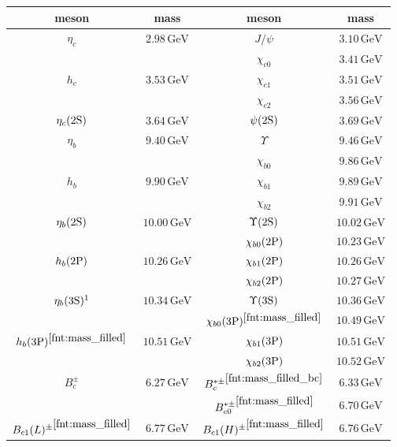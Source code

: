 \begin{table}[H]
\centering
\renewcommand*{\arraystretch}{1.4}
\begin{tabular}[t]{cc|cc}
\toprule
\textbf{meson} & \multicolumn{1}{c}{mass} & \textbf{meson} & mass \\
\midrule
$\eta_c$ & $2.98\,\mathrm{GeV}$ & $J/\psi$ & $3.10\,\mathrm{GeV}$ \\
& & $\chi_{c0}$ & $3.41\,\mathrm{GeV}$ \\
$h_c$ & $3.53\,\mathrm{GeV}$ & $\chi_{c1}$ & $3.51\,\mathrm{GeV}$ \\
& & $\chi_{c2}$ & $3.56\,\mathrm{GeV}$ \\
$\eta_c(2\mathrm{S})$ & $3.64\,\mathrm{GeV}$ & $\psi(2\mathrm{S})$ & $3.69\,\mathrm{GeV}$ \\
\midrule
$\eta_b$ & $9.40\,\mathrm{GeV}$ & $\Upsilon$ & $9.46\,\mathrm{GeV}$ \\
& & $\chi_{b0}$ & $9.86\,\mathrm{GeV}$ \\
$h_b$ & $9.90\,\mathrm{GeV}$ & $\chi_{b1}$ & $9.89\,\mathrm{GeV}$ \\
& & $\chi_{b2}$ & $9.91\,\mathrm{GeV}$ \\
$\eta_b(2\mathrm{S})$ & {$10.00\,\mathrm{GeV}$} & $\Upsilon(2\mathrm{S})$ & $10.02\,\mathrm{GeV}$ \\
& & $\chi_{b0}(2\mathrm{P})$ & $10.23\,\mathrm{GeV}$ \\
$h_b(2\mathrm{P})$ & $10.26\,\mathrm{GeV}$ & $\chi_{b1}(2\mathrm{P})$ & $10.26\,\mathrm{GeV}$ \\
& & $\chi_{b2}(2\mathrm{P})$ & $10.27\,\mathrm{GeV}$ \\
$\eta_b(3\swave)\footnotemark$ & {$10.34\,\mathrm{GeV}$} & $\Upsilon(3\mathrm{S})$ & $10.36\,\mathrm{GeV}$ \\
& & $\chi_{b0}(3\mathrm{P})^{\ref{fnt:mass_filled}}$ & {$10.49\,\mathrm{GeV}$} \\
$h_b(3\mathrm{P})^{\ref{fnt:mass_filled}}$ & {$10.51\,\mathrm{GeV}$} & $\chi_{b1}(3\mathrm{P})$ & $10.51\,\mathrm{GeV}$ \\
& & $\chi_{b2}(3\mathrm{P})$ & $10.52\,\mathrm{GeV}$ \\
\midrule
${B_c^\pm}$ & $6.27\,\mathrm{GeV}$ & ${B_c^{\ast \pm}}^{\ref{fnt:mass_filled_bc}}$ & {$6.33\,\mathrm{GeV}$} \\
& & ${B_{c0}^{\ast \pm}}^{\ref{fnt:mass_filled}}$ & {$6.70\,\mathrm{GeV}$}\\
${B_{c1}(L)^\pm}^{\ref{fnt:mass_filled}}$ &{$6.77\,\mathrm{GeV}$} & ${B_{c1}(H)^{\pm}}^{\ref{fnt:mass_filled}}$ & {$6.76\,\mathrm{GeV}$} \\

\end{tabular}
\end{table}
